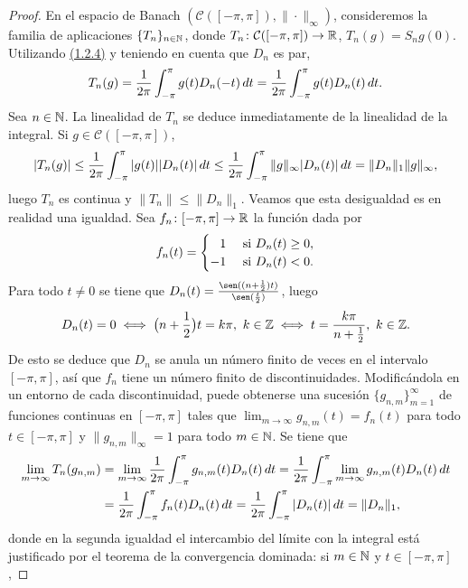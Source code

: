 \documentclass[a4paper, 12pt, oneside]{book}
\begin{document}
\begin{proof}
    En el espacio de Banach $(\mathcal{C}([-\pi,\pi]),\|\cdot\|_\infty)$, consideremos la familia de aplicaciones $\{T_n\}_{n\in \mathbb N}$, donde $T_n \colon \mathcal{C}([-\pi,\pi]) \to \mathbb R$, $T_n(g) = S_ng(0)$. Utilizando \hyperref[1.2.4]{\color{blue}(1.2.4)} y teniendo en cuenta que $D_n$ es par,
    \[T_n(g) = \frac{1}{2\pi}\int_{-\pi}^{\pi} g(t)D_n(-t) \, dt = \frac{1}{2\pi}\int_{-\pi}^{\pi} g(t)D_n(t) \, dt.\]
    Sea $n \in \mathbb N$. La linealidad de $T_n$ se deduce inmediatamente de la linealidad de la integral. Si $g \in \mathcal{C}([-\pi,\pi])$,
    \begin{align*}
        |T_n(g)|\leq \frac{1}{2\pi}\int_{-\pi}^{\pi} |g(t)||D_n(t)| \, dt \leq \frac{1}{2\pi}\int_{-\pi}^{\pi} \|g\|_\infty |D_n(t)| \, dt = \|D_n\|_1\|g\|_\infty,
    \end{align*}
    luego $T_n$ es continua y $\|T_n\| \leq \|D_n\|_1$. Veamos que esta desigualdad es en realidad una igualdad. Sea $f_n \colon [-\pi,\pi] \to \mathbb R$ la función dada por
    \[f_n(t) = \begin{cases}
        \phantom{-}1 & $ si $ D_n(t) \geq 0, \\
        -1 & $ si $ D_n(t) < 0.
    \end{cases}\]
    Para todo $t \neq 0$ se tiene que $D_n(t) = \frac{\sen((n+\frac{1}{2})t)}{\sen(\frac{t}{2})}$, luego
    \[D_n(t) = 0 \iff \bigl(n+\frac{1}{2}\bigr)t = k \pi, \ k \in \mathbb Z \iff t = \frac{k\pi}{n+\frac{1}{2}}, \ k \in \mathbb Z.\]
    De esto se deduce que $D_n$ se anula un número finito de veces en el intervalo $[-\pi,\pi]$, así que $f_n$ tiene un número finito de discontinuidades. Modificándola en un entorno de cada discontinuidad, puede obtenerse una sucesión $\{g_{n,m}\}_{m=1}^\infty$ de funciones continuas en $[-\pi,\pi]$ tales que $\lim_{m \to \infty}g_{n,m}(t) = f_n(t)$ para todo $t \in [-\pi,\pi]$ y $\|g_{n,m}\|_\infty = 1$ para todo $m \in \mathbb N$. Se tiene que
    \begin{align*}
        \lim_{m \to \infty} T_n(g_{n,m}) &= \lim_{m \to \infty} \frac{1}{2\pi}\int_{-\pi}^{\pi} g_{n,m}(t)D_n(t) \, dt =\frac{1}{2\pi}\int_{-\pi}^{\pi} \lim_{m \to \infty} g_{n,m}(t) D_n(t) \, dt \\
        &= \frac{1}{2\pi}\int_{-\pi}^{\pi} f_n(t) D_n(t) \, dt = \frac{1}{2\pi}\int_{-\pi}^{\pi} |D_n(t)| \, dt = \|D_n\|_1,
    \end{align*}
    donde en la segunda igualdad el intercambio del límite con la integral está justificado por el teorema de la convergencia dominada: si $m \in \mathbb N$ y $t \in [-\pi,\pi]$,

\end{proof}
\end{document}
